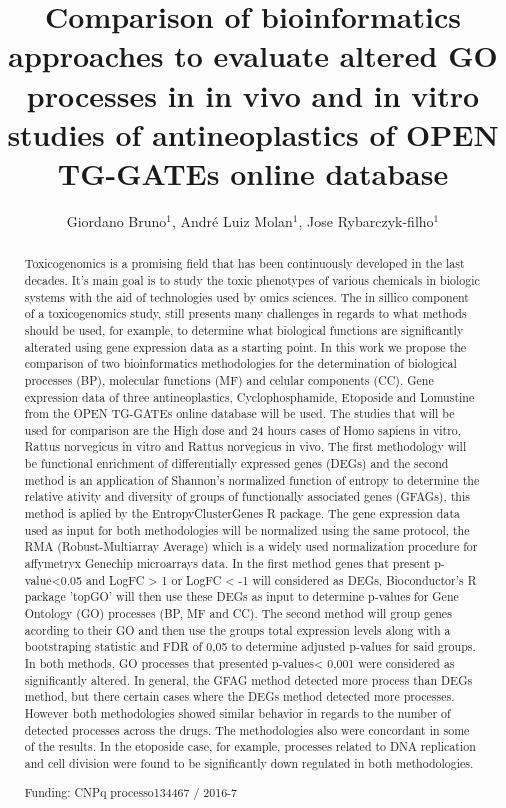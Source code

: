 \documentclass[twoside]{article}
\title{\vspace{-15mm}\fontsize{24pt}{10pt}\selectfont\textbf{Comparison of bioinformatics approaches to evaluate altered GO processes in in vivo and in vitro studies of antineoplastics of OPEN TG-GATEs online database}} %
\author{Giordano Bruno$^1$, Andr\'e Luiz Molan$^1$, Jose Rybarczyk-filho$^1$}
\affil{1 UNESP\\ }
\date{}
\begin{document}
\maketitle %

\thispagestyle{fancy} %


\begin{abstract}
Toxicogenomics is a promising field that has been continuously developed in the last decades. It's main goal is to study the toxic phenotypes of various chemicals in biologic systems with the aid of technologies used by omics sciences. The in sillico component of a toxicogenomics study, still presents many challenges in regards to what methods should be used, for example, to determine what biological functions are significantly alterated using gene expression data as a starting point. In this work we propose the comparison of two bioinformatics methodologies for the determination of biological processes (BP), molecular functions (MF) and celular components (CC). Gene expression data of three antineoplastics, Cyclophosphamide, Etoposide and Lomustine  from the OPEN TG-GATEs online database will be used. The studies that will be used for comparison are the High dose and 24 hours cases of Homo sapiens in vitro, Rattus norvegicus in vitro and Rattus norvegicus in vivo. The first methodology will be functional enrichment of differentially expressed genes (DEGs) and the second method is an application of Shannon's normalized function of entropy to determine the relative ativity and diversity of groups of functionally associated genes (GFAGs), this method is aplied by the EntropyClusterGenes R package. The gene expression data used as input for both methodologies will be normalized using the same protocol, the RMA (Robust-Multiarray Average) which is a widely used normalization procedure for affymetryx Genechip microarrays data. In the first method genes that present p-value<0.05 and LogFC > 1 or LogFC <  -1 will considered as DEGs, Bioconductor's R package 'topGO' will then use these DEGs as input to determine p-values for Gene Ontology (GO) processes (BP, MF and CC). The second method will group genes acording to their GO and then use the groups total expression levels along with a bootstraping statistic and FDR of 0,05 to determine adjusted p-values for said groups. In both methods, GO processes that presented p-values< 0,001 were considered as significantly altered. In general, the  GFAG method detected more process than DEGs method, but there certain cases where the  DEGs method detected more processes. However both methodologies showed similar behavior in regards to the number of detected processes across the drugs. The methodologies also were concordant in some of the results. In the etoposide case, for example, processes related to DNA replication and cell division were found to be significantly down regulated in both methodologies.

Funding: CNPq processo134467 / 2016-7
\end{abstract}
\end{document}
